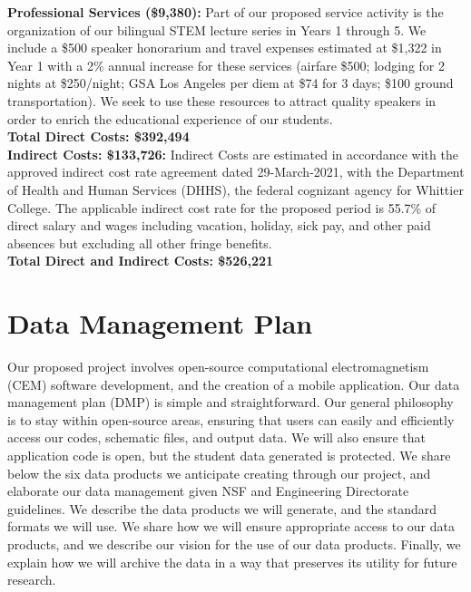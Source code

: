 \documentclass[11pt]{amsart}
\begin{document}
\noindent
\textbf{Professional Services (\$9,380):} Part of our proposed service activity is the organization of our bilingual STEM lecture series in Years 1 through 5. We include a \$500 speaker honorarium and travel expenses estimated at \$1,322 in Year 1 with a 2\% annual increase for these services (airfare \$500; lodging for 2 nights at \$250/night; GSA Los Angeles per diem at \$74 for 3 days; \$100 ground transportation). We seek to use these resources to attract quality speakers in order to enrich the educational experience of our students. \\

\noindent
\textbf{Total Direct Costs: \$392,494} \\

\noindent
\textbf{Indirect Costs: \$133,726:} Indirect Costs are estimated in accordance with the approved indirect cost rate agreement dated 29-March-2021, with the Department of Health and Human Services (DHHS), the federal cognizant agency for Whittier College. The applicable indirect cost rate for the proposed period is 55.7\% of direct salary and wages including vacation, holiday, sick pay, and other paid absences but excluding all other fringe benefits. \\

\noindent
\textbf{Total Direct and Indirect Costs: \$526,221}

\clearpage

\section{Data Management Plan}

Our proposed project involves open-source computational electromagnetism (CEM) software development, and the creation of a mobile application.  Our data management plan (DMP) is simple and straightforward.  Our general philosophy is to stay within open-source areas, ensuring that users can easily and efficiently access our codes, schematic files, and output data.  We will also ensure that application code is open, but the student data generated is protected.  We share below the six data products we anticipate creating through our project, and elaborate our data management given NSF and Engineering Directorate guidelines.  We describe the data products we will generate, and the standard formats we will use.  We share how we will ensure appropriate access to our data products, and we describe our vision for the use of our data products.  Finally, we explain how we will archive the data in a way that preserves its utility for future research. 
\end{document}

